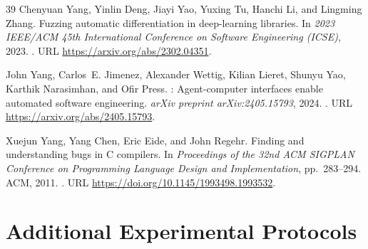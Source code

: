 \documentclass{article}
\begin{document}
\begin{thebibliography}{39}
Chenyuan Yang, Yinlin Deng, Jiayi Yao, Yuxing Tu, Hanchi Li, and Lingming
  Zhang.
\newblock Fuzzing automatic differentiation in deep-learning libraries.
\newblock In \emph{2023 IEEE/ACM 45th International Conference on Software
  Engineering (ICSE)}, 2023.
\newblock {}.
\newblock URL \url{https://arxiv.org/abs/2302.04351}.

John Yang, Carlos~E. Jimenez, Alexander Wettig, Kilian Lieret, Shunyu Yao,
  Karthik Narasimhan, and Ofir Press.
: Agent-computer interfaces enable automated software
  engineering.
\newblock \emph{arXiv preprint arXiv:2405.15793}, 2024.
\newblock {}.
\newblock URL \url{https://arxiv.org/abs/2405.15793}.

Xuejun Yang, Yang Chen, Eric Eide, and John Regehr.
\newblock Finding and understanding bugs in {C} compilers.
\newblock In \emph{Proceedings of the 32nd ACM SIGPLAN Conference on
  Programming Language Design and Implementation}, pp.\  283--294. ACM, 2011.
\newblock {}.
\newblock URL \url{https://doi.org/10.1145/1993498.1993532}.

\end{thebibliography}

\clearpage
\appendix
{}

\section{Additional Experimental Protocols}
\label{sec:supplementary-protocols}
\end{document}
